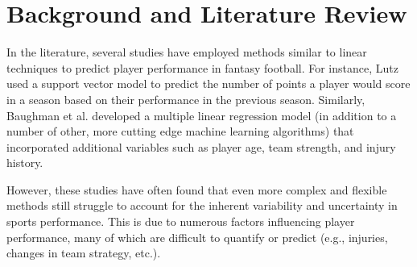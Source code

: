 \chapter{Background and Literature Review}
\label{ch:background}
\glsresetall

In the literature, several studies have employed methods similar to linear techniques to predict player performance in fantasy football. For instance, 
Lutz \cite{lutz2015}
used a support vector model to predict the number of points a player would score in a season based on their performance in the previous season. Similarly, 
Baughman et al.  \cite{baughman2021}
developed a multiple linear regression model (in addition to a number of other, more cutting edge machine learning algorithms) that incorporated additional variables such as player age, team strength, and injury history.

However, these studies have often found that even more complex and flexible methods still struggle to account for the inherent variability and uncertainty in sports performance. This is due to numerous factors influencing player performance, many of which are difficult to quantify or predict (e.g., injuries, changes in team strategy, etc.).


